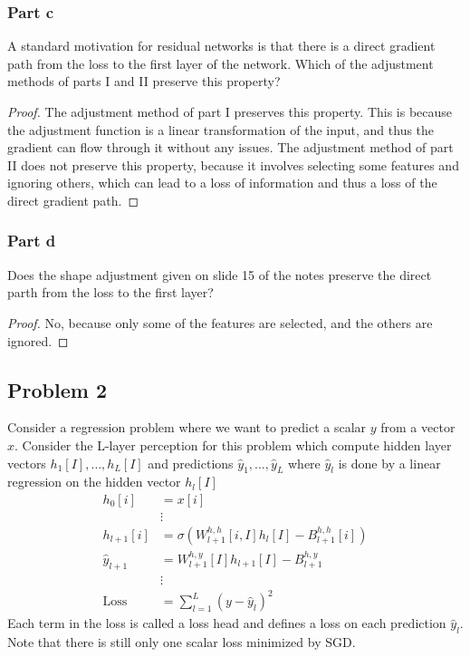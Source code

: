 \documentclass{amsart}
\theoremstyle{definition}
\begin{document}
\subsubsection*{Part c}
A standard motivation for residual networks is that there is a direct gradient path from the loss to the first layer of the network. 
Which of the adjustment methods of parts I and II preserve this property?
\begin{proof}
  The adjustment method of part I preserves this property. 
  This is because the adjustment function is a linear transformation of the input, and thus the gradient can flow through it without any issues. 
  The adjustment method of part II does not preserve this property, because it involves selecting some features and ignoring others, which can lead to a loss of information and thus a loss of the direct gradient path.
\end{proof}
\subsubsection*{Part d}
Does the shape adjustment given on slide 15 of the notes preserve the direct parth from the loss to the first layer?
\begin{proof}
  No, because only some of the features are selected, and the others are ignored.
\end{proof}

\subsection*{Problem 2}
Consider a regression problem where we want to predict a scalar $y$ from a vector $x$. 
Consider the L-layer perception for this problem which compute hidden layer vectors $h_1[I], \ldots, h_L[I]$ and predictions $\hat{y}_1, \ldots, \hat{y}_L$ where $\hat{y}_l$ is done by a linear regression on the hidden vector $h_{l}[I]$
\begin{align*}
  h_0[i] &= x[i]\\
  &\vdots\\
  h_{l + 1}[i] &= \sigma(W_{l + 1}^{h, h}[i, I] h_{l}[I] - B_{l + 1}^{h,h}[i])\\
  \hat{y}_{l + 1} &= W_{l + 1}^{h, y} [I] h_{l + 1}[I] - B_{l + 1}^{h, y}\\
  &\vdots\\
  \mathrm{Loss} &= \sum_{l = 1}^{L} (y - \hat{y}_l)^2
\end{align*}
Each term in the loss is called a loss head and defines a loss on each prediction $\hat{y}_l$.
Note that there is still only one scalar loss minimized by SGD. 
\end{document}
